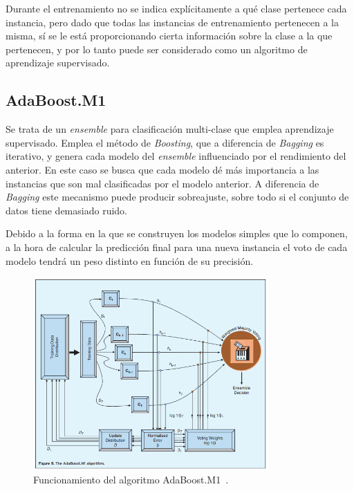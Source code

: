 Durante el entrenamiento no se indica explícitamente a qué clase pertenece cada instancia, pero dado que todas las instancias de entrenamiento pertenecen a la misma, sí se le está proporcionando cierta información sobre la clase a la que pertenecen, y por lo tanto puede ser considerado como un algoritmo de aprendizaje supervisado. 

\subsection{AdaBoost.M1}

Se trata de un \textit{ensemble} para clasificación multi-clase que emplea aprendizaje supervisado. Emplea el método de \textit{Boosting}, que a diferencia de \textit{Bagging} es iterativo, y genera cada modelo del \textit{ensemble} influenciado por el rendimiento del anterior. En este caso se busca que cada modelo dé más importancia a las instancias que son mal clasificadas por el modelo anterior. A diferencia de \textit{Bagging} este mecanismo puede producir sobreajuste, sobre todo si el conjunto de datos tiene demasiado ruido. 

Debido a la forma en la que se construyen los modelos simples que lo componen, a la hora de calcular la predicción final para una nueva instancia el voto de cada modelo tendrá un peso distinto en función de su precisión.  

\begin{figure}[H]
	\centering
	\includegraphics[width=0.8\textwidth]{../img/adaboostm1.png}
	\caption[Funcionamiento del algoritmo AdaBoost.M1.]{Funcionamiento del algoritmo AdaBoost.M1~\cite{polikar2006ensemble}.}
	\label{fig:adaboostm1}
\end{figure}

